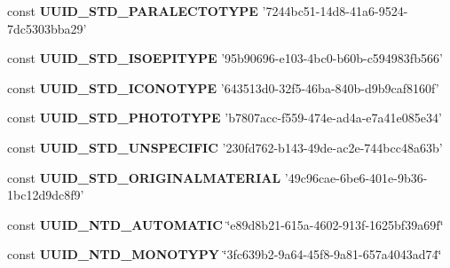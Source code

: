 \begin{DoxyCompactItemize}
\item 
\hypertarget{uuids_8php_ab20fac7e308003acced34320f882f097}{const {\bfseries U\-U\-I\-D\-\_\-\-S\-T\-D\-\_\-\-P\-A\-R\-A\-L\-E\-C\-T\-O\-T\-Y\-P\-E} '7244bc51-\/14d8-\/41a6-\/9524-\/7dc5303bba29'}\label{uuids_8php_ab20fac7e308003acced34320f882f097}

\item 
\hypertarget{uuids_8php_a277761bc3435717b7575884c000e9093}{const {\bfseries U\-U\-I\-D\-\_\-\-S\-T\-D\-\_\-\-I\-S\-O\-E\-P\-I\-T\-Y\-P\-E} '95b90696-\/e103-\/4bc0-\/b60b-\/c594983fb566'}\label{uuids_8php_a277761bc3435717b7575884c000e9093}

\item 
\hypertarget{uuids_8php_a1a744f8c2a55be3db992335497fe8077}{const {\bfseries U\-U\-I\-D\-\_\-\-S\-T\-D\-\_\-\-I\-C\-O\-N\-O\-T\-Y\-P\-E} '643513d0-\/32f5-\/46ba-\/840b-\/d9b9caf8160f'}\label{uuids_8php_a1a744f8c2a55be3db992335497fe8077}

\item 
\hypertarget{uuids_8php_a6b3beb134360935d06b1073544afc5c4}{const {\bfseries U\-U\-I\-D\-\_\-\-S\-T\-D\-\_\-\-P\-H\-O\-T\-O\-T\-Y\-P\-E} 'b7807acc-\/f559-\/474e-\/ad4a-\/e7a41e085e34'}\label{uuids_8php_a6b3beb134360935d06b1073544afc5c4}

\item 
\hypertarget{uuids_8php_a832a18a83090aaa8298200e727a48625}{const {\bfseries U\-U\-I\-D\-\_\-\-S\-T\-D\-\_\-\-U\-N\-S\-P\-E\-C\-I\-F\-I\-C} '230fd762-\/b143-\/49de-\/ac2e-\/744bcc48a63b'}\label{uuids_8php_a832a18a83090aaa8298200e727a48625}

\item 
\hypertarget{uuids_8php_a2611ff53aa5a325a1f5632d902790b51}{const {\bfseries U\-U\-I\-D\-\_\-\-S\-T\-D\-\_\-\-O\-R\-I\-G\-I\-N\-A\-L\-M\-A\-T\-E\-R\-I\-A\-L} '49c96cae-\/6be6-\/401e-\/9b36-\/1bc12d9dc8f9'}\label{uuids_8php_a2611ff53aa5a325a1f5632d902790b51}

\item 
\hypertarget{uuids_8php_ac34e680ee12ea218b67d9762d2704832}{const {\bfseries U\-U\-I\-D\-\_\-\-N\-T\-D\-\_\-\-A\-U\-T\-O\-M\-A\-T\-I\-C} \char`\"{}e89d8b21-\/615a-\/4602-\/913f-\/1625bf39a69f\char`\"{}}\label{uuids_8php_ac34e680ee12ea218b67d9762d2704832}

\item 
\hypertarget{uuids_8php_a7c1fa1631421e9a1d63ba8969dd715bb}{const {\bfseries U\-U\-I\-D\-\_\-\-N\-T\-D\-\_\-\-M\-O\-N\-O\-T\-Y\-P\-Y} \char`\"{}3fc639b2-\/9a64-\/45f8-\/9a81-\/657a4043ad74\char`\"{}}\label{uuids_8php_a7c1fa1631421e9a1d63ba8969dd715bb}


\end{DoxyCompactItemize}
